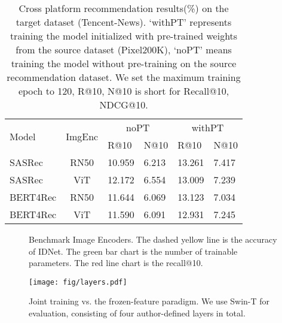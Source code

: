\documentclass[sigconf]{acmart}
\begin{document}
	\begin{table}[t]
		\centering	
		\caption{Cross platform recommendation results(\%) on the target dataset (Tencent-News). `withPT' represents training the model initialized with pre-trained weights from the source dataset (Pixel200K), `noPT' means training the model without pre-training on the source recommendation dataset. We set the maximum training epoch to 120, R@10, N@10 is short for Recall@10, NDCG@10.}
		\setlength{\tabcolsep}{7pt}
		\label{tab:transfer}

		\begin{tabularx}{\linewidth}{l c l l l l }
			\toprule
			\multirow{2}{*}{Model} & \multirow{2}{*}{ImgEnc}&\multicolumn{2}{c}{noPT}& \multicolumn{2}{c}{withPT}\\
			\cmidrule(r){3-4} \cmidrule(r){5-6} 
			&& R@10 & N@10& R@10 & N@10 \\
			
			\midrule
			SASRec & RN50 & 10.959 &6.213 &13.261 & 7.417\\
			SASRec & ViT & 12.172&6.554& 13.009 & 7.239 \\
   
			
			BERT4Rec & RN50& 11.644 &6.069 &13.123 & 7.034\\
			BERT4Rec & ViT& 11.590 &6.091 & 12.931 & 7.245\\		
			\bottomrule
				\end{tabularx}
	\end{table}	
	
\begin{figure}
		\centering
{}
		\caption{Benchmark Image Encoders. The dashed yellow line is the accuracy of IDNet. The green bar chart is the number of trainable parameters. The red line chart is the recall@10. }
		\label{imeben}
\end{figure}


\begin{figure}[t]
	\centering
	\texttt{[image: fig/layers.pdf]}
	\caption{Joint training vs. the frozen-feature paradigm.  We use Swin-T for evaluation, consisting of  four author-defined layers in total.}
	\label{fig:layer}


\end{figure}
\end{document}

